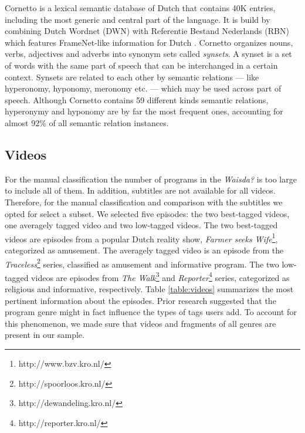 Cornetto is a lexical semantic database of Dutch that contains 40K entries, including the most generic and central part of the language. It is build by combining Dutch Wordnet (DWN) with Referentie Bestand Nederlands (RBN) which features FrameNet-like information for Dutch \cite{Vossen08}. Cornetto organizes nouns, verbs, adjectives and adverbs into synonym sets called \textit{synsets}. A synset is a set of words with the same part of speech that can be interchanged in a certain context. Synsets are related to each other by semantic relations --- like hyperonomy, hyponomy, meronomy etc. --- which may be used across part of speech. Although Cornetto contains 59 different kinds semantic relations, hyperonymy and hyponomy are by far the most frequent ones, accounting for almost 92\% of all semantic relation instances.

\subsection{Videos}\label{videos}

For the manual classification the number of programs in the \emph{Waisda?} is
too large to include all of them. In addition, subtitles are not available for
all videos. Therefore, for the manual classification and comparison with the
subtitles we opted for select a subset. We selected five episodes: the two
best-tagged videos, one averagely tagged video and two low-tagged videos. The
two best-tagged videos are episodes from a popular Dutch reality show,
\textit{Farmer seeks Wife}\footnote{http://www.bzv.kro.nl/}, categorized as
amusement. The averagely tagged video is an episode from the
\textit{Traceless}\footnote{http://spoorloos.kro.nl/} series, classified as
amusement and informative program. The two low-tagged videos are episodes from
\textit{The Walk}\footnote{http://dewandeling.kro.nl/} and
\textit{Reporter}\footnote{http://reporter.kro.nl/} series, categorized as
religious and informative, respectively. Table \ref{table:videos} summarizes
the most pertinent information about the episodes. Prior research
\cite{waisda} suggested that the program genre might in fact influence the
types of tags users add. To account for this phenomenon, we made sure that
videos and fragments of all genres are present in our sample.

